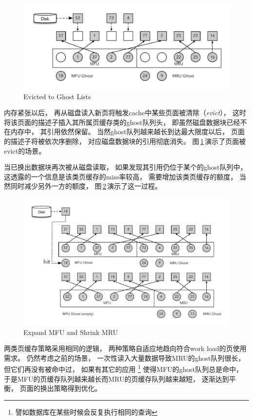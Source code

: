 \begin{figure}[!ht]
  \centering
  \includegraphics[width=\textwidth]{fig/zfs_arc1.pdf}
  \caption{Evicted to Ghost Lists}\label{fig:zfs_arc1}
\end{figure}

内存紧张以后，
再从磁盘读入新页将触发cache中某些页面被清除（{\em evict}），
这时将该页面的描述子插入其所属页缓存类的ghost队列头，
即虽然磁盘数据块已经不在内存中，
其引用依然保留。
当然ghost队列越来越长到达最大限度以后，
页面的描述子将被依次序删除，
对应磁盘数据块的引用彻底消失。
图\,\ref{fig:zfs_arc1}\,演示了页面被evict的场景。

当已换出数据块再次被从磁盘读取，
如果发现其引用仍位于某个的ghost队列中，
这透露的一个信息是该类页缓存的miss率较高，
需要增加该类页缓存的额度，
当然同时减少另外一方的额度，
图\,\ref{fig:zfs_arc2}\,演示了这一过程。

\begin{figure}[!ht]
  \centering
  \includegraphics[width=\textwidth]{fig/zfs_arc2.pdf}
  \caption{Expand MFU and Shrink MRU}\label{fig:zfs_arc2}
\end{figure} 

两类页缓存策略采用相同的逻辑，
两种策略自适应地趋向符合work load的页使用需求。
仍然考虑之前的场景，
一次性读入大量数据导致MRU的ghost队列很长，
但它们再没有被命中过，
如果有其它的应用%
\footnote{譬如数据库在某些时候会反复执行相同的查询}%
使得MFU的ghost队列总是命中，
于是MFU的页缓存队列越来越长而MRU的页缓存队列越来越短，
逐渐达到平衡，
页面的换出策略得到优化。

